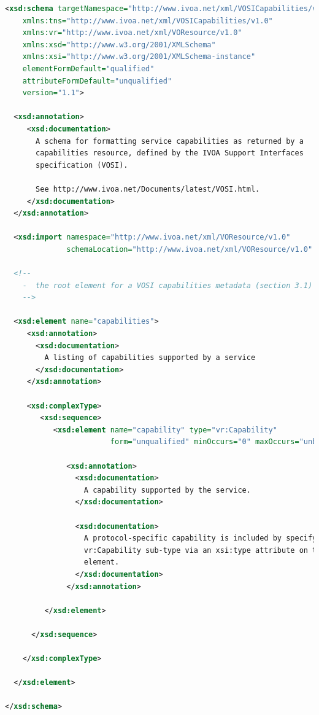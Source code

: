 \documentclass[11pt,letter]{ivoa}
\begin{document}
\begin{lstlisting}[language=XML]
<xsd:schema targetNamespace="http://www.ivoa.net/xml/VOSICapabilities/v1.0"
    xmlns:tns="http://www.ivoa.net/xml/VOSICapabilities/v1.0"
    xmlns:vr="http://www.ivoa.net/xml/VOResource/v1.0"
    xmlns:xsd="http://www.w3.org/2001/XMLSchema"
    xmlns:xsi="http://www.w3.org/2001/XMLSchema-instance"
    elementFormDefault="qualified"
    attributeFormDefault="unqualified"
    version="1.1">

  <xsd:annotation>
     <xsd:documentation>
       A schema for formatting service capabilities as returned by a 
       capabilities resource, defined by the IVOA Support Interfaces 
       specification (VOSI). 

       See http://www.ivoa.net/Documents/latest/VOSI.html.  
     </xsd:documentation>
  </xsd:annotation>

  <xsd:import namespace="http://www.ivoa.net/xml/VOResource/v1.0"
              schemaLocation="http://www.ivoa.net/xml/VOResource/v1.0" />

  <!--
    -  the root element for a VOSI capabilities metadata (section 3.1)
    -->

  <xsd:element name="capabilities">
     <xsd:annotation>
       <xsd:documentation>
         A listing of capabilities supported by a service
       </xsd:documentation>
     </xsd:annotation>

     <xsd:complexType>
        <xsd:sequence>
           <xsd:element name="capability" type="vr:Capability" 
                        form="unqualified" minOccurs="0" maxOccurs="unbounded">

              <xsd:annotation>
                <xsd:documentation>
                  A capability supported by the service.  
                </xsd:documentation>

                <xsd:documentation>
                  A protocol-specific capability is included by specifying a
                  vr:Capability sub-type via an xsi:type attribute on this 
                  element.
                </xsd:documentation>
              </xsd:annotation>

         </xsd:element>

      </xsd:sequence>

    </xsd:complexType>

  </xsd:element>

</xsd:schema>
\end{lstlisting}
\end{document}
